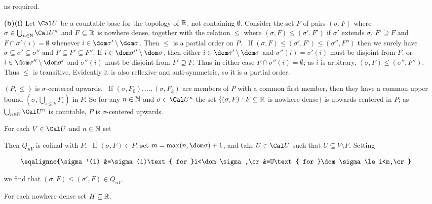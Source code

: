 {\noindent as required.

\medskip

{\bf (b)(i)} Let $\Cal U$ be a countable base for the topology of
$\Bbb R$, not containing $\emptyset$.   Consider the set $P$ of pairs
$(\sigma,F)$ where $\sigma\in\bigcup_{n\in\Bbb N}\Cal U^n$ and
$F\subseteq\Bbb R$ is nowhere dense, together with the relation $\le$
where $(\sigma,F)\le(\sigma',F')$ if $\sigma'$ extends $\sigma$,
$F'\supseteq F$ and $F\cap\sigma'(i)=\emptyset$ whenever
$i\in\dom\sigma'\setminus\dom\sigma$.   Then $\le$ is a partial order on
$P$.   \Prf\ If $(\sigma,F)\le(\sigma',F')\le(\sigma'',F'')$ then we
surely have $\sigma\subseteq\sigma'\subseteq\sigma''$ and
$F\subseteq F'\subseteq F''$.   If
$i\in\dom\sigma''\setminus\dom\sigma$, then either
$i\in\dom\sigma'\setminus\dom\sigma$ and $\sigma''(i)=\sigma'(i)$ must
be disjoint from $F$, or $i\in\dom\sigma''\setminus\dom\sigma'$ and
$\sigma''(i)$ must be disjoint from $F'\supseteq F$.   Thus in either
case $F\cap\sigma''(i)=\emptyset$;  as $i$ is arbitrary,
$(\sigma,F)\le(\sigma'',F'')$.   Thus $\le$ is transitive.   Evidently
it is also reflexive and anti-symmetric, so it is a partial order.\ \Qed

\medskip

 $(P,\le)$ is $\sigma$-centered upwards.   \Prf\ If
$(\sigma,F_0),\ldots,(\sigma,F_k)$ are members of $P$ with a common
first member, then they have a common upper bound
$(\sigma,\bigcup_{i\le k}F_i)$ in $P$.   So for any $n\in\Bbb N$ and
$\sigma\in\Cal U^n$ the set
$\{(\sigma,F):F\subseteq\Bbb R$ is nowhere dense$\}$ is upwards-centered
in $P$;  as $\bigcup_{n\in\Bbb N}\Cal U^n$ is countable, $P$ is
$\sigma$-centered upwards.\ \Qed

\medskip

 For each $V\in\Cal U$ and $n\in\Bbb N$ set


\noindent Then $Q_{nV}$ is cofinal with $P$.   \Prf\ If
$(\sigma,F)\in P$, set $m=\max(n,\dom\sigma)+1$, and take $U\in\Cal U$
such that $U\subseteq V\setminus F$.   Setting

$$\eqalignno{\sigma'(i)
&=\sigma(i)\text{ for }i<\dom\sigma,\cr
&=U\text{ for }\dom\sigma\le i<m,\cr}$$

\noindent we find that $(\sigma,F)\le(\sigma',F)\in Q_{nV}$.\ \Qed

For each nowhere dense set $H\subseteq\Bbb R$,

}
